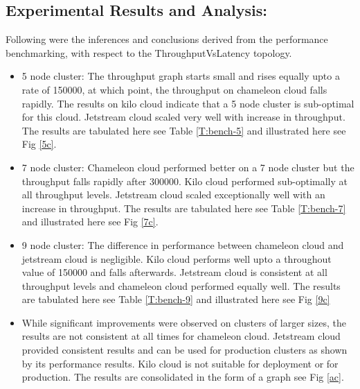\documentclass[9pt,twocolumn,twoside]{../../styles/osajnl}
\begin{document}
\subsection{Experimental Results and Analysis:}
Following were the inferences and conclusions derived from the performance
benchmarking, with respect to the ThroughputVsLatency topology.
\begin{itemize}
\item 5 node cluster: The throughput graph starts small and rises
  equally upto a rate of 150000, at which point, the throughput on
  chameleon cloud falls rapidly.  The results on kilo cloud indicate
  that a 5 node cluster is sub-optimal for this cloud. Jetstream cloud
  scaled very well with increase in throughput. The results are
  tabulated here see Table \ref{T:bench-5} and illustrated here see
  Fig \ref{5c}.
\item 7 node cluster: Chameleon cloud performed better on a 7 node
  cluster but the throughput falls rapidly after 300000. Kilo cloud
  performed sub-optimally at all throughput levels. Jetstream cloud
  scaled exceptionally well with an increase in throughput. The
  results are tabulated here see Table \ref{T:bench-7} and illustrated here
  see Fig \ref{7c}.
\item 9 node cluster: The difference in performance between chameleon
  cloud and jetstream cloud is negligible. Kilo cloud performs well
  upto a throughout value of 150000 and falls afterwards. Jetstream
  cloud is consistent at all throughput levels and chameleon cloud
  performed equally well. The results are tabulated here
  see Table \ref{T:bench-9} and illustrated here see Fig \ref{9c}
\item While significant improvements were observed on clusters of
  larger sizes, the results are not consistent at all times for
  chameleon cloud. Jetstream cloud provided consistent results and can
  be used for production clusters as shown by its performance
  results. Kilo cloud is not suitable for deployment or for
  production. The results are consolidated in the form of a graph
  see Fig \ref{ac}.
\end{itemize}
\end{document}
